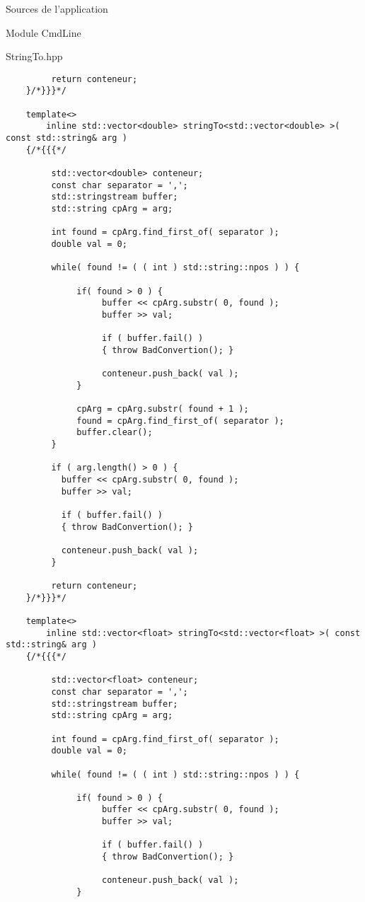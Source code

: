 \documentclass{article}
\begin{document}
\begin{section}{Sources de l'application}
\begin{subsection}{Module CmdLine}
\begin{paragraph}{StringTo.hpp}
\begin{verbatim}
         return conteneur;
    }/*}}}*/

    template<>
        inline std::vector<double> stringTo<std::vector<double> >( const std::string& arg )
    {/*{{{*/

         std::vector<double> conteneur;
         const char separator = ',';
         std::stringstream buffer;
         std::string cpArg = arg;

         int found = cpArg.find_first_of( separator );
         double val = 0;

         while( found != ( ( int ) std::string::npos ) ) {

              if( found > 0 ) {
                   buffer << cpArg.substr( 0, found );
                   buffer >> val;
                   
                   if ( buffer.fail() )
                   { throw BadConvertion(); }

                   conteneur.push_back( val );
              }

              cpArg = cpArg.substr( found + 1 );
              found = cpArg.find_first_of( separator );
              buffer.clear();
         }

         if ( arg.length() > 0 ) {
           buffer << cpArg.substr( 0, found );
           buffer >> val;

           if ( buffer.fail() )
           { throw BadConvertion(); }
           
           conteneur.push_back( val );
         }

         return conteneur;
    }/*}}}*/
    
    template<>
        inline std::vector<float> stringTo<std::vector<float> >( const std::string& arg )
    {/*{{{*/

         std::vector<float> conteneur;
         const char separator = ',';
         std::stringstream buffer;
         std::string cpArg = arg;

         int found = cpArg.find_first_of( separator );
         double val = 0;

         while( found != ( ( int ) std::string::npos ) ) {

              if( found > 0 ) {
                   buffer << cpArg.substr( 0, found );
                   buffer >> val;
                   
                   if ( buffer.fail() )
                   { throw BadConvertion(); }

                   conteneur.push_back( val );
              }


\end{verbatim}
\end{paragraph}
\end{subsection}
\end{section}
\end{document}
